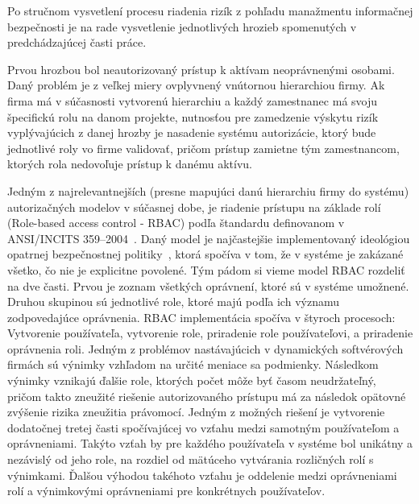 Po stručnom vysvetlení procesu riadenia rizík z pohľadu manažmentu informačnej bezpečnosti je na rade vysvetlenie
jednotlivých hrozieb spomenutých v predchádzajúcej časti práce.

Prvou hrozbou bol neautorizovaný prístup k aktívam neoprávnenými osobami.
Daný problém je z veľkej miery ovplyvnený vnútornou hierarchiou firmy.
Ak firma má v súčasnosti vytvorenú hierarchiu a každý zamestnanec má svoju špecifickú rolu na danom projekte, nutnosťou
pre zamedzenie výskytu rizík vyplývajúcich z danej hrozby je nasadenie systému autorizácie, ktorý bude jednotlivé roly
vo firme validovať, pričom prístup zamietne tým zamestnancom, ktorých rola nedovoľuje prístup k danému aktívu.

Jedným z najrelevantnejších (presne mapujúci danú hierarchiu firmy do systému) autorizačných modelov v súčasnej dobe, je riadenie prístupu na základe rolí (Role-based
access control - RBAC) podľa štandardu definovanom v ANSI/INCITS 359–2004~\cite{RBAC}.
Daný model je najčastejšie implementovaný ideológiou opatrnej bezpečnostnej politiky~\cite{OpatrnaBezpecnostnaPolitika},
ktorá spočíva v tom, že v systéme je zakázané všetko, čo nie je explicitne povolené.
Tým pádom si vieme model RBAC rozdeliť na dve časti.
Prvou je zoznam všetkých oprávnení, ktoré sú v systéme umožnené.
Druhou skupinou sú jednotlivé role, ktoré majú podľa ich významu zodpovedajúce oprávnenia.
RBAC implementácia spočíva v štyroch procesoch: Vytvorenie používateľa, vytvorenie role, priradenie role používateľovi,
a priradenie oprávnenia roli.
Jedným z problémov nastávajúcich v dynamických softvérových firmách sú výnimky vzhľadom na určité meniace sa podmienky.
Následkom výnimky vznikajú ďalšie role, ktorých počet môže byť časom neudržateľný,
pričom takto zneužité riešenie autorizovaného prístupu má za následok opätovné zvýšenie rizika zneužitia právomocí.
Jedným z možných riešení je vytvorenie dodatočnej tretej časti spočívajúcej vo vzťahu medzi samotným používateľom a oprávneniami.
Takýto vzťah by pre každého používateľa v systéme bol unikátny a nezávislý od jeho role, na rozdiel od mätúceho
vytvárania rozličných rolí s výnimkami.
Ďalšou výhodou takéhoto vzťahu je oddelenie medzi oprávneniami rolí a výnimkovými oprávneniami pre konkrétnych používateľov.

